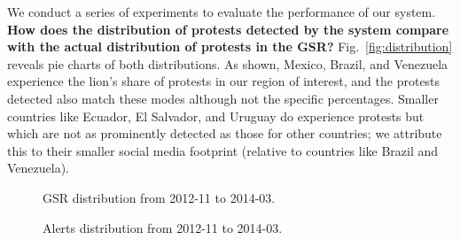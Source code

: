 \documentclass[letterpaper]{article}
\begin{document}
We conduct a series of experiments to evaluate the performance of our
system.\\

\noindent
{\bf How does the distribution of protests detected by the system
compare with the actual distribution of protests in the GSR?}
Fig.~\ref{fig:distribution} reveals pie charts of both distributions. As
shown, Mexico, Brazil, and Venezuela experience the lion's share of
protests in our region of interest, and the protests detected also match
these modes although not the specific percentages. Smaller countries
like Ecuador, El Salvador, and Uruguay do experience protests but which
are not as prominently detected as those for other countries; we
attribute this to their smaller social media footprint (relative to
countries like Brazil and Venezuela).\\
\begin{figure*}
\begin{subfigure}{0.4\columnwidth}
  \raggedleft
  \caption{\scriptsize GSR distribution from 2012-11 to 2014-03.}
  \label{fig:gsrdistribution}
\end{subfigure}\hspace{3.2em}%
\begin{subfigure}{.4\columnwidth}
  \raggedright
  \caption{\scriptsize Alerts distribution from 2012-11 to 2014-03.}
  \label{fig:ppdistribution}
\end{subfigure}
\caption{Distribution of alerts and GSR events across the Latin American countries studied in this paper.}
\label{fig:distribution}
\end{figure*}
\end{document}
